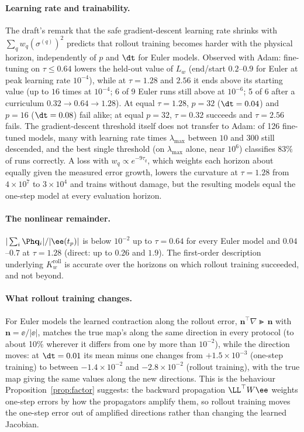 \paragraph{Learning rate and trainability.}
The draft's remark that the safe gradient-descent learning rate shrinks with $\sum_q w_q(\sigma^{(q)})^2$ predicts that rollout training becomes harder with the physical horizon, independently of $p$ and $\dt$ for Euler models.
Observed with Adam:
fine-tuning on $\tau\le0.64$ lowers the held-out value of $L_w$ (end/start $0.2$--$0.9$ for Euler at peak learning rate $10^{-4}$), while at $\tau = 1.28$ and $2.56$ it ends above its starting value (up to $16$ times at $10^{-4}$; 6 of 9 Euler runs still above at $10^{-6}$; 5 of 6 after a curriculum $0.32\to0.64\to1.28$).
At equal $\tau = 1.28$, $p = 32$ ($\dt = 0.04$) and $p = 16$ ($\dt = 0.08$) fail alike; at equal $p = 32$, $\tau = 0.32$ succeeds and $\tau = 2.56$ fails.
The gradient-descent threshold itself does not transfer to Adam: of 126 fine-tuned models, many with learning rate times $\lambda_{\max}$ between $10$ and $300$ still descended, and the best single threshold (on $\lambda_{\max}$ alone, near $10^6$) classifies $83\%$ of runs correctly.
A loss with $w_q\propto e^{-9\tau_q}$, which weights each horizon about equally given the measured error growth, lowers the curvature at $\tau = 1.28$ from $4\times10^7$ to $3\times10^4$ and trains without damage, but the resulting models equal the one-step model at every evaluation horizon.

\paragraph{The nonlinear remainder.}
$|\sum_i\Ph\mathbf q_i|/|\ee(t_p)|$ is below $10^{-2}$ up to $\tau = 0.64$ for every Euler model and $0.04$--$0.7$ at $\tau = 1.28$ (direct: up to $0.26$ and $1.9$).
The first-order description underlying $K^{\mathrm{roll}}_w$ is accurate over the horizons on which rollout training succeeded, and not beyond.

\paragraph{What rollout training changes.}
For Euler models the learned contraction along the rollout error, $\mathbf n^\top\nabla\Gt\,\mathbf n$ with $\mathbf n = \ee/|\ee|$, matches the true map's along the same direction in every protocol (to about 10\% wherever it differs from one by more than $10^{-2}$), while the direction moves: at $\dt = 0.01$ its mean minus one changes from $+1.5\times10^{-3}$ (one-step training) to between $-1.4\times10^{-2}$ and $-2.8\times10^{-2}$ (rollout training), with the true map giving the same values along the new directions.
This is the behaviour Proposition~\ref{prop:factor} suggests: the backward propagation $\LL^\top W\ee$ weights one-step errors by how the propagators amplify them, so rollout training moves the one-step error out of amplified directions rather than changing the learned Jacobian.

